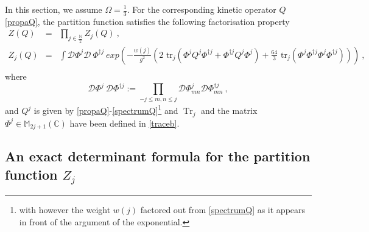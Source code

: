 \documentclass[a4paper,11pt,twoside]{article}
\numberwithin{equation}{section}
\DeclareMathOperator{\tr}{Tr}
\theoremstyle{nonumberplain}
\newcounter{and}
\begin{document}
In this section, we assume $\Omega=\frac{1}{3}$. For the corresponding kinetic operator $Q$ \eqref{propaQ}, the partition function satisfies the following factorisation property%
%
\begin{eqnarray}
Z(Q) &=& \prod_{j\in\frac{\mathbb{N}}{2}} Z_j(Q) \ , \label{zq} \\
Z_j(Q) &=& \int{\mathcal{D}} \Phi^j \mathcal{D} \ \Phi^{\dag j} \ exp\left(-\frac{w(j)}{g^2} \left( 2 \mbox{ tr}_j\left(\Phi^j Q^j\Phi^{\dag j}+\Phi^{\dag j} Q^j\Phi^j\right)+\frac{64}{3}\mbox{ tr}_j\left(\Phi^j\Phi^{\dag j}\Phi^j\Phi^{\dag j}\right) \right)\right) \ , \label{zqj} \nonumber \\
\end{eqnarray}
%
where%
%
\begin{equation}
\mathcal{D} \Phi^j \ \mathcal{D} \Phi^{\dag j} := \prod_{-j\le m,n\le j} \mathcal{D} \Phi^j_{mn} \mathcal{D} \Phi^{\dag j}_{mn} \ , \label{measure}
\end{equation}
%
and $Q^j$ is given by \eqref{propaQ}-\eqref{spectrumQ}{\footnote{with however the weight $w(j)$ factored out from \eqref{spectrumQ} as it appears in front of the argument of the exponential.}} and $\tr_j$ and the matrix $\Phi^j\in\mathbb{M}_{2j+1}(\mathbb{C})$ have been defined in \eqref{traceb}.\par%

\subsection{\texorpdfstring{An exact determinant formula for the partition function $Z_j$}{Exact partition function}}\label{subsection41}
\end{document}
